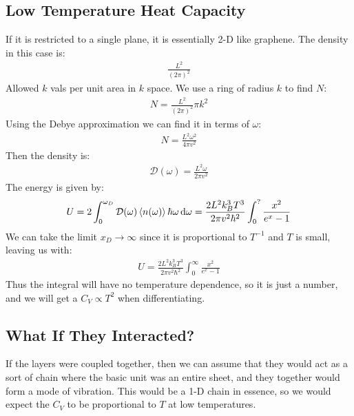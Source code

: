 \documentclass[12pt]{article}
\newcommand{\D}{\mathcal{D}}
\begin{document}
\subsection*{Low Temperature Heat Capacity}
If it is restricted to a single plane, it is essentially 2-D like graphene. The density in this case is:
\begin{align*}
  \frac{L^2}{(2\pi)^2}
\end{align*}
Allowed $k$ vals per unit area in $k$ space. We use a ring of radius $k$ to find $N$:
\begin{align*}
  N=\frac{L^2}{(2\pi)^2}\pi k^2
\end{align*}
Using the Debye approximation we can find it in terms of $\omega$:
\begin{align*}
  N=\frac{L^2\omega^2}{4\pi v^2}
\end{align*}
Then the density is:
\begin{align*}
  \D(\omega)=\frac{L^2\omega}{2\pi v^2}
\end{align*}
The energy is given by:
\begin{align*}
  U=2\int_0^{\omega_D}\D(\omega)\ev{n(\omega)}\hbar\omega\dd{\omega}
  =\frac{2L^2k_B^3T^3}{2\pi v^2\hbar^2}\int_0^?\frac{x^2}{e^{x}-1}
\end{align*}
We can take the limit $x_D\to\infty$ since it is proportional to $T^{-1}$ and $T$ is small, leaving us with:
\begin{align*}
  U=\frac{2L^2k_B^3T^3}{2\pi v^2\hbar^2}\int_0^\infty\frac{x^2}{e^{x}-1}
\end{align*}
Thus the integral will have no temperature dependence, so it is just a number, and we will get a $C_V\propto T^2$ when differentiating.
\subsection*{What If They Interacted?}
If the layers were coupled together, then we can assume that they would act as a sort of chain where the basic unit was an entire sheet, and they together would form a mode of vibration. This would be a 1-D chain in essence, so we would expect the $C_V$ to be proportional to $T$ at low temperatures.
\end{document}
